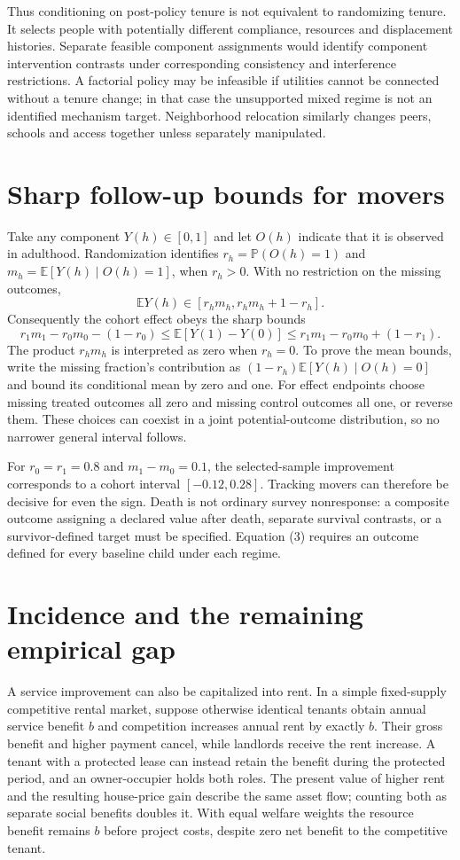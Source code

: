 \documentclass[11pt,a4paper]{article}
\newcommand{\E}{\mathbb E}
\newcommand{\Prb}{\mathbb P}
\begin{document}
Thus conditioning on post-policy tenure is not equivalent to randomizing tenure. It selects people with potentially different compliance, resources and displacement histories. Separate feasible component assignments would identify component intervention contrasts under corresponding consistency and interference restrictions. A factorial policy may be infeasible if utilities cannot be connected without a tenure change; in that case the unsupported mixed regime is not an identified mechanism target. Neighborhood relocation similarly changes peers, schools and access together unless separately manipulated.

\section{Sharp follow-up bounds for movers}
Take any component $Y(h)\in[0,1]$ and let $O(h)$ indicate that it is observed in adulthood. Randomization identifies $r_h=\Prb(O(h)=1)$ and $m_h=\E[Y(h)\mid O(h)=1]$, when $r_h>0$. With no restriction on the missing outcomes,
\[
 \E Y(h)\in[r_hm_h,r_hm_h+1-r_h].
\]
Consequently the cohort effect obeys the sharp bounds
\[
 r_1m_1-r_0m_0-(1-r_0)
 \le\E[Y(1)-Y(0)]\le
 r_1m_1-r_0m_0+(1-r_1).                              \tag{3}
\]
The product $r_hm_h$ is interpreted as zero when $r_h=0$. To prove the mean bounds, write the missing fraction's contribution as $(1-r_h)\E[Y(h)\mid O(h)=0]$ and bound its conditional mean by zero and one. For effect endpoints choose missing treated outcomes all zero and missing control outcomes all one, or reverse them. These choices can coexist in a joint potential-outcome distribution, so no narrower general interval follows.

For $r_0=r_1=0.8$ and $m_1-m_0=0.1$, the selected-sample improvement corresponds to a cohort interval $[-0.12,0.28]$. Tracking movers can therefore be decisive for even the sign. Death is not ordinary survey nonresponse: a composite outcome assigning a declared value after death, separate survival contrasts, or a survivor-defined target must be specified. Equation (3) requires an outcome defined for every baseline child under each regime.

\section{Incidence and the remaining empirical gap}
A service improvement can also be capitalized into rent. In a simple fixed-supply competitive rental market, suppose otherwise identical tenants obtain annual service benefit $b$ and competition increases annual rent by exactly $b$. Their gross benefit and higher payment cancel, while landlords receive the rent increase. A tenant with a protected lease can instead retain the benefit during the protected period, and an owner-occupier holds both roles. The present value of higher rent and the resulting house-price gain describe the same asset flow; counting both as separate social benefits doubles it. With equal welfare weights the resource benefit remains $b$ before project costs, despite zero net benefit to the competitive tenant.
\end{document}
